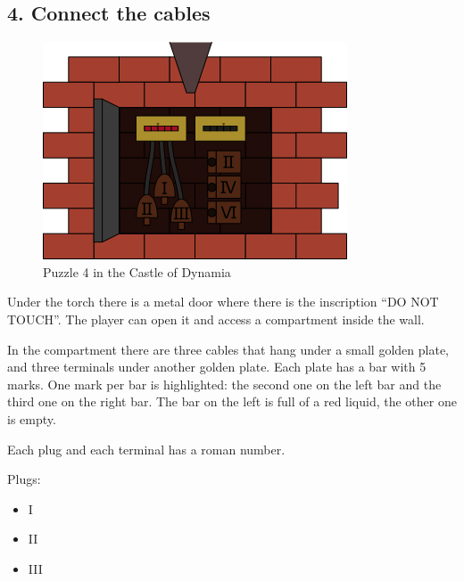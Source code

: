 

\subsection{4. Connect the cables}

\begin{figure}[H]
  \centering
  \includegraphics[width=\textwidth]{Images/Puzzles/castleOfDynamia4}
  \caption{Puzzle 4 in the Castle of Dynamia}
\end{figure}


Under the torch there is a metal door where there is the inscription \enquote{DO NOT TOUCH}. The player can open it and access a compartment inside the wall.

In the compartment there are three cables that hang under a small golden plate, and three terminals under another golden plate. Each plate has a bar with 5 marks. One mark per bar is highlighted: the second one on the left bar and the third one on the right bar. The bar on the left is full of a red liquid, the other one is empty.

Each plug and each terminal has a roman number.

Plugs:
\begin{itemize}
	\item I
	\item II
	\item III
\end{itemize}

